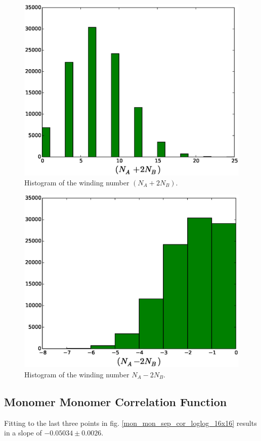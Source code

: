 \documentclass[aps,floatfix,11pt]{revtex4-1}
\begin{document}
\begin{figure}[h]
    \centering
    \includegraphics[width=8.5 cm]{W_vrt_NAp2NB_no_mod_dmr_dmr_mdl}
    \caption{Histogram of the winding number $(N_A + 2N_B)$.\label{}}
\end{figure}


\begin{figure}[h]
    \centering
    \includegraphics[width=8.5 cm]{W_vrt_NAm2NB_dmr_dmr_mdl}
    \caption{Histogram of the winding number $N_A - 2N_B$.\label{}}
\end{figure}

\clearpage

\subsection{Monomer Monomer Correlation Function}
Fitting to the last three points in fig. \ref{mon_mon_sep_cor_loglog_16x16} results in a slope of
$-0.05034\pm 0.0026$.
\end{document}
